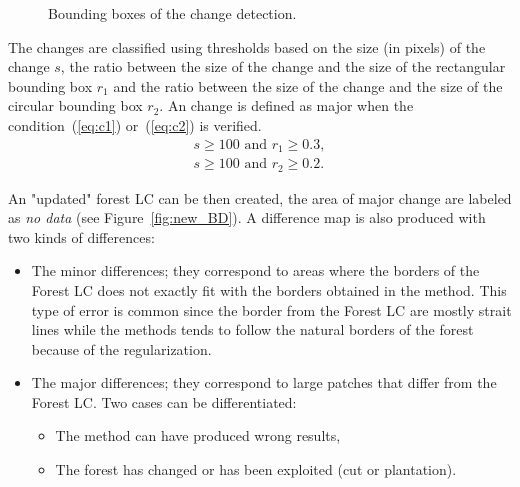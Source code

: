 \begin{figure}[htbp]
\begin{center}
{\label{subfig:changesb}
}
\hfill
{}
\endgroup
\caption{Bounding boxes of the change detection.}
\label{fig:changes}
\end{center}
\end{figure}

The changes are classified using thresholds based on the size (in pixels) of the change $s$, the ratio between the size of the change and the size of the rectangular bounding box $r_{1}$ and  the ratio between the size of the change and the size of the circular bounding box $r_{2}$. An change is defined as major when the condition~(\ref{eq:c1}) or~(\ref{eq:c2}) is verified. 
\begin{eqnarray}
s \geq 100 \text{ and } r_{1} \geq 0.3, \label{eq:c1}\\
s \geq 100 \text{ and } r_{2} \geq 0.2. \label{eq:c2}
\end{eqnarray}

An "updated" forest LC can be then created, the area of major change are labeled as \textit{no data} (see Figure~\ref{fig:new_BD}). A difference map is also produced with two kinds of differences:
\begin{itemize}
\item The minor differences; they correspond to areas where the borders of the Forest LC does not exactly fit with the borders obtained in the method. This type of error is common since the border from the Forest LC are mostly strait lines while the methods tends to follow the natural borders of the forest because of the regularization.
\item The major differences; they correspond to large patches that differ from the Forest LC. Two cases can be differentiated:
\begin{itemize}
\item The method can have produced wrong results,
\item The forest has changed or has been exploited (cut or plantation).
\end{itemize}
\end{itemize}

